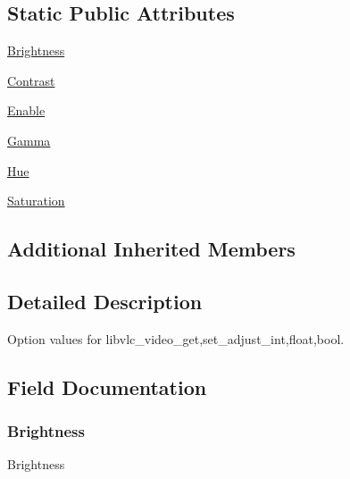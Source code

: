 \subsection*{Static Public Attributes}
\begin{DoxyCompactItemize}
\item 
\hyperlink{classvlc_1_1_video_adjust_option_a2c361c9ad6210393f1646454f207cc1d}{Brightness}
\item 
\hyperlink{classvlc_1_1_video_adjust_option_a690b0e5bb0e1902989e2a077a8508e62}{Contrast}
\item 
\hyperlink{classvlc_1_1_video_adjust_option_af2ce2eedd3baae85c5ea4b456a737b1b}{Enable}
\item 
\hyperlink{classvlc_1_1_video_adjust_option_ad27051a208a727acb41b5c200526da68}{Gamma}
\item 
\hyperlink{classvlc_1_1_video_adjust_option_a24086826b7352686f3f9176c9c480e7d}{Hue}
\item 
\hyperlink{classvlc_1_1_video_adjust_option_a276a75a8a6d37e9cec3f23eb0e2dc517}{Saturation}
\end{DoxyCompactItemize}
\subsection*{Additional Inherited Members}


\subsection{Detailed Description}
\begin{DoxyVerb}Option values for libvlc_video_{get,set}_adjust_{int,float,bool}.
\end{DoxyVerb}
 

\subsection{Field Documentation}
\mbox{\label{classvlc_1_1_video_adjust_option_a2c361c9ad6210393f1646454f207cc1d}} 
\subsubsection{\texorpdfstring{Brightness}{Brightness}}
{\footnotesize\ttfamily Brightness\hspace{0.3cm}{\ttfamily [static]}}

